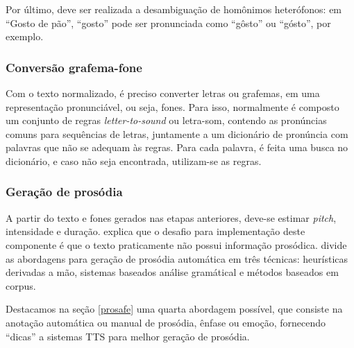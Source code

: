 Por último, deve ser realizada a desambiguação de homônimos heterófonos: em
``Gosto de pão'', ``gosto'' pode ser pronunciada como ``gôsto'' ou ``gósto'',
por exemplo.

\subsubsection{Conversão grafema-fone}
Com o texto normalizado, é preciso converter letras ou grafemas, em uma
representação pronunciável, ou seja, fones. Para isso, normalmente é composto um
conjunto de regras \emph{letter-to-sound} ou letra-som, contendo as pronúncias
comuns para sequências de letras, juntamente a um dicionário de pronúncia com
palavras que não se adequam às regras. Para cada palavra, é feita uma busca no
dicionário, e caso não seja encontrada, utilizam-se as regras.



\subsubsection{Geração de prosódia}
\label{gerpros}
A partir do texto e fones gerados nas etapas anteriores, deve-se estimar
\emph{pitch}, intensidade e duração.  explica que o
desafio para implementação deste componente é que o texto praticamente não
possui informação prosódica.  divide as abordagens para
geração de prosódia automática em três técnicas: heurísticas derivadas a mão,
sistemas baseados análise gramátical e métodos baseados em corpus.

Destacamos na seção \ref{prosafe} uma quarta abordagem possível, que consiste na
anotação automática ou manual de prosódia, ênfase ou emoção, fornecendo
``dicas'' a sistemas TTS para melhor geração de prosódia.

